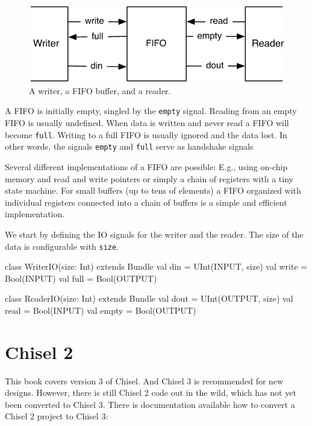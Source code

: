 \documentclass[%
    11pt, %
    headinclude, footexclude,
    openright, %
    notitlepage,
    cleardoubleempty,
    headsepline,
    pointlessnumbers,
    bibtotoc, idxtotoc,
    ]{scrbook}
\newcommand{\code}[1]{{\small{\texttt{#1}}}}
\begin{document}
\begin{figure}
  \centering
  \includegraphics{figures/fifo}

  \caption{A writer, a FIFO buffer, and a reader.}
  \label{fig:fifo}
\end{figure}

A FIFO is initially empty, singled by the \code{empty} signal. Reading
from an empty FIFO is usually undefined. When data is written and never
read a FIFO will become \code{full}. Writing to a full FIFO is usually ignored
and the data lost. In other words, the signals \code{empty} and \code{full}
serve as handshake signals 

Several different implementations of a FIFO are possible: E.g., using on-chip
memory and read and write pointers or simply a chain of registers with a
tiny state machine. For small buffers (up to tens of elements) a FIFO organized
with individual registers connected into a chain of buffers is a simple and efficient
implementation.

We start by defining the IO signals for the writer and the reader. The size of
the data is configurable with \code{size}.

\begin{chisel}
class WriterIO(size: Int) extends Bundle {
  val din = UInt(INPUT, size)
  val write = Bool(INPUT)
  val full = Bool(OUTPUT)
}

class ReaderIO(size: Int) extends Bundle {
  val dout = UInt(OUTPUT, size)
  val read = Bool(INPUT)
  val empty = Bool(OUTPUT)
}
\end{chisel}

\chapter{Chisel 2}

This book covers version 3 of Chisel. And Chisel 3 is recommended for new designs.
However, there is still Chisel 2 code out in the wild, which has not yet been converted
to Chisel 3. There is documentation available how to convert a Chisel 2 project to
Chisel 3:
\end{document}

